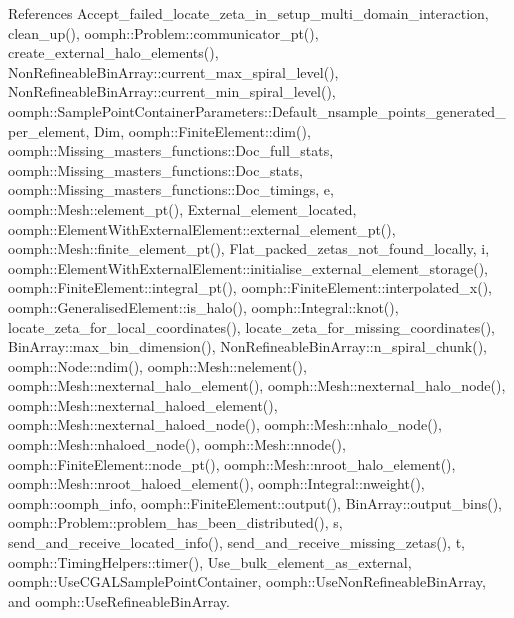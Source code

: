 References Accept\+\_\+failed\+\_\+locate\+\_\+zeta\+\_\+in\+\_\+setup\+\_\+multi\+\_\+domain\+\_\+interaction, clean\+\_\+up(), oomph\+::\+Problem\+::communicator\+\_\+pt(), create\+\_\+external\+\_\+halo\+\_\+elements(), Non\+Refineable\+Bin\+Array\+::current\+\_\+max\+\_\+spiral\+\_\+level(), Non\+Refineable\+Bin\+Array\+::current\+\_\+min\+\_\+spiral\+\_\+level(), oomph\+::\+Sample\+Point\+Container\+Parameters\+::\+Default\+\_\+nsample\+\_\+points\+\_\+generated\+\_\+per\+\_\+element, Dim, oomph\+::\+Finite\+Element\+::dim(), oomph\+::\+Missing\+\_\+masters\+\_\+functions\+::\+Doc\+\_\+full\+\_\+stats, oomph\+::\+Missing\+\_\+masters\+\_\+functions\+::\+Doc\+\_\+stats, oomph\+::\+Missing\+\_\+masters\+\_\+functions\+::\+Doc\+\_\+timings, e, oomph\+::\+Mesh\+::element\+\_\+pt(), External\+\_\+element\+\_\+located, oomph\+::\+Element\+With\+External\+Element\+::external\+\_\+element\+\_\+pt(), oomph\+::\+Mesh\+::finite\+\_\+element\+\_\+pt(), Flat\+\_\+packed\+\_\+zetas\+\_\+not\+\_\+found\+\_\+locally, i, oomph\+::\+Element\+With\+External\+Element\+::initialise\+\_\+external\+\_\+element\+\_\+storage(), oomph\+::\+Finite\+Element\+::integral\+\_\+pt(), oomph\+::\+Finite\+Element\+::interpolated\+\_\+x(), oomph\+::\+Generalised\+Element\+::is\+\_\+halo(), oomph\+::\+Integral\+::knot(), locate\+\_\+zeta\+\_\+for\+\_\+local\+\_\+coordinates(), locate\+\_\+zeta\+\_\+for\+\_\+missing\+\_\+coordinates(), Bin\+Array\+::max\+\_\+bin\+\_\+dimension(), Non\+Refineable\+Bin\+Array\+::n\+\_\+spiral\+\_\+chunk(), oomph\+::\+Node\+::ndim(), oomph\+::\+Mesh\+::nelement(), oomph\+::\+Mesh\+::nexternal\+\_\+halo\+\_\+element(), oomph\+::\+Mesh\+::nexternal\+\_\+halo\+\_\+node(), oomph\+::\+Mesh\+::nexternal\+\_\+haloed\+\_\+element(), oomph\+::\+Mesh\+::nexternal\+\_\+haloed\+\_\+node(), oomph\+::\+Mesh\+::nhalo\+\_\+node(), oomph\+::\+Mesh\+::nhaloed\+\_\+node(), oomph\+::\+Mesh\+::nnode(), oomph\+::\+Finite\+Element\+::node\+\_\+pt(), oomph\+::\+Mesh\+::nroot\+\_\+halo\+\_\+element(), oomph\+::\+Mesh\+::nroot\+\_\+haloed\+\_\+element(), oomph\+::\+Integral\+::nweight(), oomph\+::oomph\+\_\+info, oomph\+::\+Finite\+Element\+::output(), Bin\+Array\+::output\+\_\+bins(), oomph\+::\+Problem\+::problem\+\_\+has\+\_\+been\+\_\+distributed(), s, send\+\_\+and\+\_\+receive\+\_\+located\+\_\+info(), send\+\_\+and\+\_\+receive\+\_\+missing\+\_\+zetas(), t, oomph\+::\+Timing\+Helpers\+::timer(), Use\+\_\+bulk\+\_\+element\+\_\+as\+\_\+external, oomph\+::\+Use\+C\+G\+A\+L\+Sample\+Point\+Container, oomph\+::\+Use\+Non\+Refineable\+Bin\+Array, and oomph\+::\+Use\+Refineable\+Bin\+Array.

